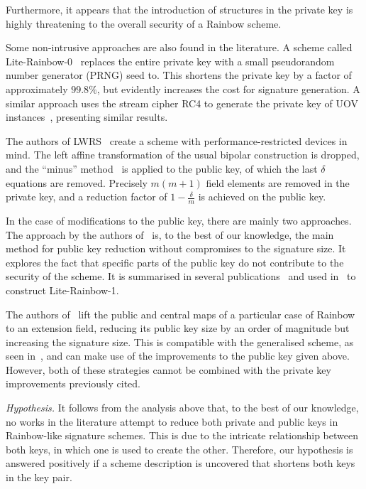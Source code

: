 \documentclass[draft, 12pt, a4paper, oneside]{memoir}
\begin{document}
Furthermore, it appears that the introduction of structures in the private key is highly threatening to the overall security of a Rainbow scheme.

Some non-intrusive approaches are also found in the literature. A scheme called Lite-Rainbow-0~\cite{} replaces the entire private key with a small pseudorandom number generator (PRNG) seed to. This shortens the private key by a factor of approximately $99.8\%$, but evidently increases the cost for signature generation. A similar approach uses the stream cipher RC4 to generate the private key of UOV instances~\cite{}, presenting similar results. 

The authors of LWRS~\cite{} create a scheme with performance-restricted devices in mind. The left affine transformation of the usual bipolar construction is dropped, and the ``minus'' method~\cite[Subsection 3.2.1]{} is applied to the public key, of which the last $\delta$ equations are removed. Precisely $m (m + 1)$ field elements are removed in the private key, and a reduction factor of $1 - \frac{\delta}{m}$ is achieved on the public key. %

In the case of modifications to the public key, there are mainly two approaches.
The approach by the authors of~\cite{Petzoldt:201006:inproc} is, to the best of 
our knowledge, the main method for public key reduction without compromises to
the signature size. It explores the fact that specific parts of the public key
do not contribute to the security of the scheme. It is summarised in several
publications~\cite{Petzoldt:201012:inproc,Petzoldt:201103:inproc,Petzoldt:201211:inproc,Petzoldt:201307:phd}
and used in~\cite{Shim:201512:inproc} to construct Lite-Rainbow-1.

The authors of~\cite{Szepieniec:201706:inproc} lift the public and central maps
of a particular case of Rainbow to an extension field, reducing its public 
key size by an order of magnitude but increasing the signature size. This is 
compatible with the generalised scheme, as seen in~\cite{Beullens:201706:msc,Beullens:201712:inproc},
and can make use of the improvements to the public key given above. However,
both of these strategies cannot be combined with the private key improvements
previously cited. 

\emph{Hypothesis.} It follows from the analysis above that, to the best of our knowledge, no works in the literature attempt to reduce both private and public keys in Rainbow-like signature schemes. This is due to the intricate relationship between both keys, in which one is used to create the other. Therefore, our hypothesis is answered positively if a scheme description is uncovered that shortens both keys in the key pair.
\end{document}
